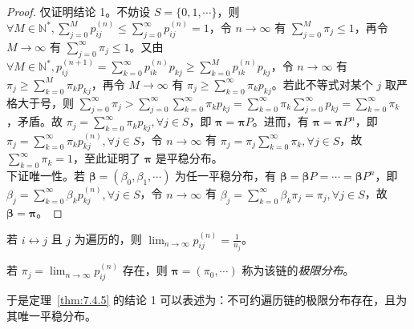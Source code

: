 \documentclass[../main.tex]{subfiles}
\begin{document}
\begin{proof}
    仅证明结论 1。不妨设 $S=\{0,1,\cdots\}$，则 $\forall M\in\mathbb N^*,\sum_{j=0}^Mp_{ij}^{(n)}\leq\sum_{j=0}^\infty p_{ij}^{(n)}=1$，令 $n\rightarrow\infty$ 有 $\sum_{j=0}^M\pi_j\leq1$，再令 $M\rightarrow\infty$ 有 $\sum_{j=0}^\infty\pi_j\leq1$。又由 $\forall M\in\mathbb N^*,p_{ij}^{(n+1)}=\sum_{k=0}^\infty p_{ik}^{(n)}p_{kj}\geq\sum_{k=0}^Mp_{ik}^{(n)}p_{kj}$，令 $n\rightarrow\infty$ 有 $\pi_j\geq\sum_{k=0}^M\pi_kp_{kj}$，再令 $M\rightarrow\infty$ 有 $\pi_j\geq\sum_{k=0}^\infty\pi_kp_{kj}$。若此不等式对某个 $j$ 取严格大于号，则 $\sum_{j=0}^\infty\pi_j>\sum_{j=0}^\infty\sum_{k=0}^\infty\pi_kp_{kj}=\sum_{k=0}^\infty\pi_k\sum_{j=0}^\infty p_{kj}=\sum_{k=0}^\infty\pi_k$，矛盾。故 $\pi_j=\sum_{k=0}^\infty\pi_kp_{kj},\forall j\in S$，即 $\boldsymbol\pi=\boldsymbol\pi P$。进而，有 $\boldsymbol\pi=\boldsymbol\pi P^n$，即 $\pi_j=\sum_{k=0}^\infty\pi_kp_{kj}^{(n)},\forall j\in S$，令 $n\rightarrow\infty$ 有 $\pi_j=\pi_j\sum_{k=0}^\infty\pi_k,\forall j\in S$，故 $\sum_{k=0}^\infty\pi_k=1$，至此证明了 $\boldsymbol\pi$ 是平稳分布。\\
    下证唯一性。若 $\boldsymbol\beta=(\beta_0,\beta_1,\cdots)$ 为任一平稳分布，有 $\boldsymbol\beta=\boldsymbol\beta P=\cdots=\boldsymbol\beta P^n$，即 $\beta_j=\sum_{k=0}^\infty\beta_kp_{kj}^{(n)},\forall j\in S$，令 $n\rightarrow\infty$ 有 $\beta_j=\sum_{k=0}^\infty\beta_k\pi_j=\pi_j,\forall j\in S$，故 $\boldsymbol\beta=\boldsymbol\pi$。
\end{proof}

\begin{proposition}
    若 $i\leftrightarrow j$ 且 $j$ 为遍历的，则 $\lim_{n\rightarrow\infty}p_{ij}^{(n)}=\frac1{u_j}$。
\end{proposition}


\begin{definition}\label{def:7.4.4}
    若 $\pi_j=\lim_{n\rightarrow\infty}p_{ij}^{(n)}$ 存在，则 $\boldsymbol\pi=(\pi_0,\cdots)$ 称为该链的\emph{极限分布}。
\end{definition}

于是定理~\ref{thm:7.4.5} 的结论 1 可以表述为：不可约遍历链的极限分布存在，且为其唯一平稳分布。
\end{document}

